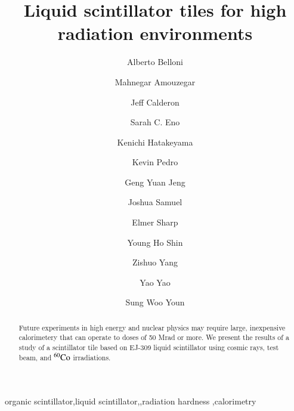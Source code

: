 \documentclass[review]{elsarticle}
\begin{document}
\begin{frontmatter}

\title{Liquid scintillator tiles for high radiation environments }


\author[umd]{Alberto Belloni}
\author[umd]{Mahnegar Amouzegar}
\author[umd]{Jeff Calderon}
\author[umd]{Sarah C. Eno}
\author[baylor]{Kenichi Hatakeyama}
\author[fnal]{Kevin Pedro}
\author[umd]{Geng Yuan Jeng}
\author[umd]{Joshua Samuel}
\author[elmer]{Elmer Sharp}
\author[umd]{Young Ho Shin}
\author[umd]{Zishuo Yang}
\author[umd]{Yao Yao}
\author[korea]{Sung Woo Youn}




\address[umd]{Dept. Physics, U. Maryland, College Park MD 30742 USA}
\address[eljen]{Eljen Technology, 1300 W. Broadway, Sweetwater, Tx 79556 USA}
\address[korea]{Institute for Basic Science, Center for Axion and Precision Physics Research, IBS Center for Axion and Precision Physics Research
Room 4315, Department of Physics, Natural Science Building (E6-2), KAIST,
291 Daehak-ro, Yuseong-gu, Daejeon 305-701, South Korea}
\address[elmer]{Elmer Sharp Engineering, 7007 Leesville Blvd. Springfield, VA 22151}
\address[fnal]{Fermi National Accelerator Laboratory, Batavia, IL, USA}
\address[baylor]{Baylor University, Waco, Texas, USA}

\begin{abstract}
Future experiments in high energy and nuclear physics may require large, inexpensive calorimetery that can operate to doses of 50 Mrad or more.
We present the results of a study of a scintillator tile based on EJ-309 liquid scintillator using cosmic rays, test beam, and $\rm{^{60}Co}$ irradiations. 
\end{abstract}

\begin{keyword}
organic scintillator\sep liquid scintillator\sep \sep radiation hardness \sep calorimetry
\end{keyword}

\end{frontmatter}

\linenumbers
\end{document}
